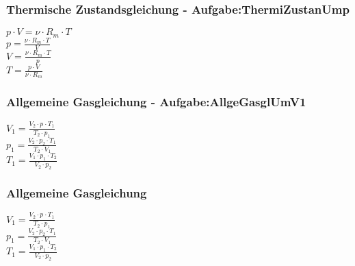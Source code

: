 \subsubsection{Thermische Zustandsgleichung - Aufgabe:ThermiZustanUmp} 
\begin{minipage}{0.45\textwidth} 
$ p\cdot V =\nu \cdot R_{m} \cdot T $\\ 
$ p =\frac{\nu \cdot R_{m} \cdot T}{  V} $\\ 
$ V =\frac{\nu \cdot R_{m} \cdot T}{  p} $\\ 
$ T =\frac{p\cdot V}{\nu \cdot R_{m} } $\\ 
\end{minipage} 
\begin{minipage}{0.45\textwidth} 
 
\end{minipage} 
\subsubsection{Allgemeine Gasgleichung - Aufgabe:AllgeGasglUmV1} 
\begin{minipage}{0.45\textwidth} 
$ V_{1}  = \frac{V_{2} \cdot p_{} \cdot T_{1} }{  T_{2} \cdot p_{1} } $\\ 
$ p_{1}  = \frac{V_{2} \cdot p_{2} \cdot T_{1} }{  T_{2} \cdot V_{1} } $\\ 
$ T_{1}  = \frac{V_{1} \cdot p_{1} \cdot T_{2} }{  V_{2} \cdot p_{2} } $\\ 
\end{minipage} 
\begin{minipage}{0.45\textwidth} 
 
\end{minipage} 
\subsubsection{Allgemeine Gasgleichung} 
\begin{minipage}{0.45\textwidth} 
$ V_{1}  = \frac{V_{2} \cdot p_{} \cdot T_{1} }{  T_{2} \cdot p_{1} } $\\ 
$ p_{1}  = \frac{V_{2} \cdot p_{2} \cdot T_{1} }{  T_{2} \cdot V_{1} } $\\ 
$ T_{1}  = \frac{V_{1} \cdot p_{1} \cdot T_{2} }{  V_{2} \cdot p_{2} } $\\ 
\end{minipage} 
\begin{minipage}{0.45\textwidth} 
 
\end{minipage} 
